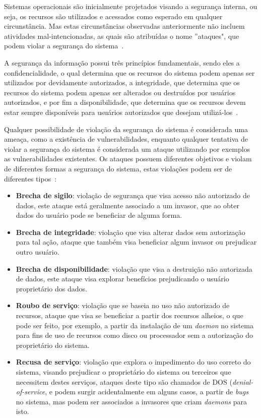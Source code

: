 \documentclass[
	12pt,				%
	oneside,   	        %
	a4paper,			%
	english,			%
	french,				%
	spanish,			%
	brazil,				%
	]{pacotes/abntex2}
\begin{document}
Sistemas operacionais são inicialmente projetados visando a segurança interna, ou seja, os recursos são utilizados e acessados como esperado em qualquer circunstância. Mas estas circunstâncias observadas anteriormente não incluem atividades mal-intencionadas, as quais são atribuídas o nome ''ataques", que podem violar a segurança do sistema~\cite{silberschatz2015}.

A segurança da informação possui três princípios fundamentais, sendo eles a confidencialidade, o qual determina que os recursos do sistema podem apenas ser utilizados por devidamente autorizados, a integridade, que determina que os recursos do sistema podem apenas ser alterados ou destruídos por usuários autorizados, e por fim a disponibilidade, que determina que os recursos devem estar sempre disponíveis para usuários autorizados que desejam utilizá-los~\cite{maziero2019}.

Qualquer possibilidade de violação da segurança do sistema é considerada uma ameaça, como a existência de vulnerabilidades, enquanto qualquer tentativa de violar a segurança do sistema é considerada um ataque utilizando por exemplos as vulnerabilidades existentes. Os ataques possuem diferentes objetivos e violam de diferentes formas a segurança do sistema, estas violações podem ser de diferentes tipos~\cite{silberschatz2015}:

\begin{itemize}
    \item \textbf{Brecha de sigilo}: violação de segurança que visa acesso não autorizado de dados, este ataque está geralmente associado a um invasor, que ao obter dados do usuário pode se beneficiar de alguma forma.
    \item \textbf{Brecha de integridade}: violação que visa alterar dados sem autorização para tal ação, ataque que também visa beneficiar algum invasor ou prejudicar outro usuário.
    \item \textbf{Brecha de disponibilidade}: violação que visa a destruição não autorizada de dados, este ataque visa explorar benefícios prejudicando o usuário proprietário dos dados.
    \item \textbf{Roubo de serviço}: violação que se baseia no uso não autorizado de recursos, ataque que visa se beneficiar a partir dos recursos alheios, o que pode ser feito, por exemplo, a partir da instalação de um \textit{daemon} no sistema para fins de uso de recursos como disco ou processador sem a autorização do proprietário do sistema.
    \item \textbf{Recusa de serviço}: violação que explora o impedimento do uso correto do sistema, visando prejudicar o proprietário do sistema ou terceiros que necessitem destes serviços, ataques deste tipo são chamados de DOS (\textit{denial-of-service}, e podem surgir acidentalmente em alguns casos, a partir de \textit{bugs} no sistema, mas podem ser associados a invasores que criam \textit{daemons} para isto.
\end{itemize}
\end{document}
